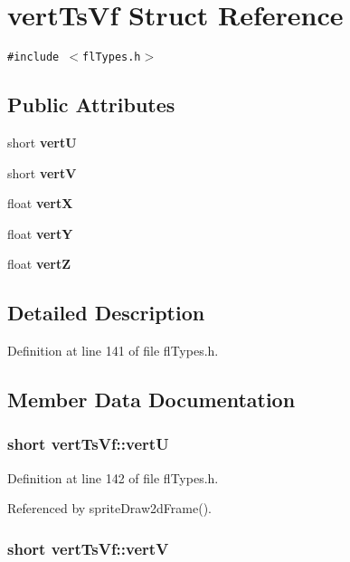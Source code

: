 \section{vert\-Ts\-Vf Struct Reference}
\label{structvertTsVf}
{\tt \#include $<$fl\-Types.h$>$}

\subsection*{Public Attributes}
\begin{CompactItemize}
\item 
short {\bf vert\-U}
\item 
short {\bf vert\-V}
\item 
float {\bf vert\-X}
\item 
float {\bf vert\-Y}
\item 
float {\bf vert\-Z}
\end{CompactItemize}


\subsection{Detailed Description}




Definition at line 141 of file fl\-Types.h.

\subsection{Member Data Documentation}
\subsubsection{\setlength{\rightskip}{0pt plus 5cm}short {\bf vert\-Ts\-Vf::vert\-U}}\label{structvertTsVf_4f81e7cde272d6da4c52059918be807b}




Definition at line 142 of file fl\-Types.h.

Referenced by sprite\-Draw2d\-Frame().
\subsubsection{\setlength{\rightskip}{0pt plus 5cm}short {\bf vert\-Ts\-Vf::vert\-V}}\label{structvertTsVf_225184a2f5975b69e6dedec3ed4c196a}




